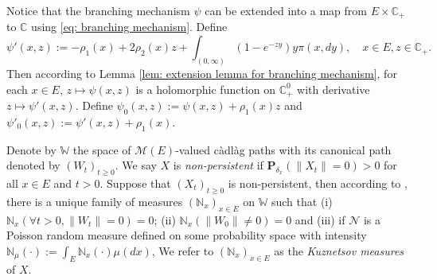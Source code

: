 \documentclass[12pt,a4paper]{amsart}
\theoremstyle{plain}
\theoremstyle{definition}
\numberwithin{equation}{section}
\begin{document}
Notice that the branching mechanism $\psi$ can be extended into a map from $E \times \mathbb C_+$ to $\mathbb C$ using \eqref{eq: branching mechanism}.
Define
\begin{equation}
  \psi'(x,z)
  := - \rho_1(x) + 2\rho_2(x) z + \int_{(0,\infty)} (1-e^{-zy})y\pi(x,dy),
  \quad x\in E, z\in \mathbb C_+.
\end{equation}
Then according to Lemma \ref{lem: extension lemma for branching mechanism}, for each $x \in E$, $z \mapsto \psi(x,z)$ is a holomorphic function on $\mathbb C_+^0$ with derivative $z \mapsto \psi'(x,z)$.
Define $\psi_0(x,z) := \psi(x,z)+ \rho_1(x)z $ and $\psi'_0(x,z) := \psi'(x,z) + \rho_1(x)$.

Denote by $\mathbb W$ the space of $\mathcal M(E)$-valued c\`{a}dl\`{a}g paths with its canonical path denoted by $(W_t)_{t\geq 0}$.
We say $X$ is \emph{non-persistent} if $\mathbf P_{\delta_x}(\|X_t\|= 0) > 0$ for all $x\in E$ and $t> 0$.
Suppose that $(X_t)_{t\geq 0}$ is non-persistent, then according to \cite[Section 8.4]{Li2011Measure-valued}, there is a unique family of measures $(\mathbb N_x)_{x\in E}$ on $\mathbb W$ such that
(i) $\mathbb N_x (\forall t > 0, \|W_t\|=0) =0$; (ii) $\mathbb N_x(\|W_0 \|\neq 0) = 0$
and (iii) if $\mathcal N$ is a Poisson random measure defined on some probability space with intensity $\mathbb N_\mu(\cdot):= \int_E \mathbb N_x(\cdot )\mu(dx)$,
We refer to $(\mathbb N_x)_{x\in E}$ as the \emph{Kuznetsov measures} of $X$.

\end{document}
